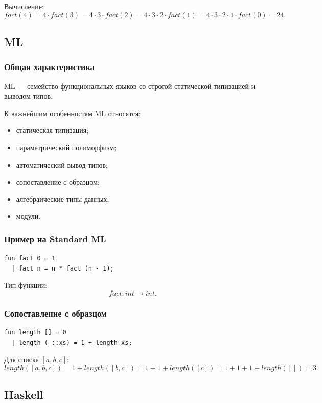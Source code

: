 \documentclass[12pt,a4paper]{article}
\begin{document}
Вычисление:
$$
fact(4) = 4 \cdot fact(3)
        = 4 \cdot 3 \cdot fact(2)
        = 4 \cdot 3 \cdot 2 \cdot fact(1)
        = 4 \cdot 3 \cdot 2 \cdot 1 \cdot fact(0)
        = 24.
$$

\subsection{ML}

\subsubsection{Общая характеристика}

ML --- семейство функциональных языков со строгой статической типизацией и выводом типов.

К важнейшим особенностям ML относятся:
\begin{itemize}
    \item статическая типизация;
    \item параметрический полиморфизм;
    \item автоматический вывод типов;
    \item сопоставление с образцом;
    \item алгебраические типы данных;
    \item модули.
\end{itemize}

\subsubsection{Пример на Standard ML}

\begin{lstlisting}
fun fact 0 = 1
  | fact n = n * fact (n - 1);
\end{lstlisting}

Тип функции:
$$
fact : int \to int.
$$

\subsubsection{Сопоставление с образцом}

\begin{lstlisting}
fun length [] = 0
  | length (_::xs) = 1 + length xs;
\end{lstlisting}

Для списка $[a,b,c]$:
$$
length([a,b,c]) = 1 + length([b,c])
= 1 + 1 + length([c])
= 1 + 1 + 1 + length([])
= 3.
$$

\subsection{Haskell}
\end{document}
